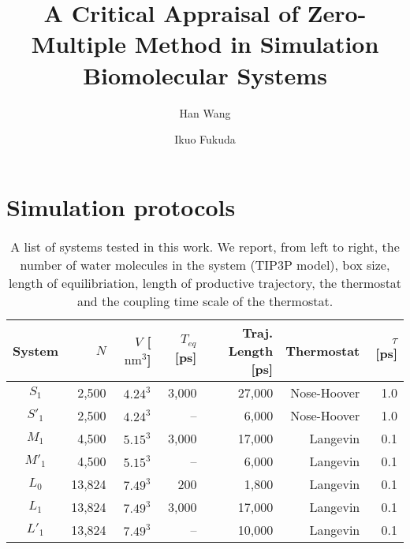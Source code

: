 \documentclass[aip,jcp,a4paper,preprint,unsortedaddress,onecolumn,fleqn]{revtex4-1}
\newcommand{\systemsb}{S_1}
\newcommand{\systemsbp}{S'_1}
\newcommand{\systemmb}{M_1}
\newcommand{\systemmbp}{M'_1}
\newcommand{\systemla}{L_0}
\newcommand{\systemlbp}{L'_1}
\newcommand{\systemlb}{L_1}
\begin{document}
\title{A Critical Appraisal of Zero-Multiple Method in Simulation Biomolecular Systems}
\author{Han Wang}
\author{Ikuo Fukuda}

\begin{abstract}
\end{abstract}

\maketitle

\section{Simulation protocols}

\begin{table}
  \centering
  \caption{A list of systems tested in this work. We report, from left to right, the number of water
    molecules in the system (TIP3P model), box size, length of equilibriation, length of productive trajectory, the thermostat and the coupling time scale of the thermostat.
    }
  \begin{tabular*}{0.9\textwidth}{@{\extracolsep{\fill}}c rrrrrr}\hline\hline
    System      & $N$ & $V$ [$\textrm{nm}^3$]  & $T_{eq}$ [ps] & Traj. Length [ps] & Thermostat & $\tau$ [ps]  \\\hline
    $\systemsb$          & 2,500          & $4.24^3$              & 3,000        & 27,000        & Nose-Hoover & 1.0 \\
    $\systemsbp$         &   2,500        & $4.24^3$              & --           &  6,000        & Nose-Hoover & 1.0\\
    $\systemmb$          & 4,500          & $5.15^3$              & 3,000        & 17,000        & Langevin & 0.1\\
    $\systemmbp$         &   4,500        & $5.15^3$              & --           &  6,000        & Langevin & 0.1\\
    $\systemla$          &   13,824       & $7.49^3$              & 200          & 1,800         & Langevin & 0.1\\
    $\systemlb$          &   13,824       & $7.49^3$              & 3,000        & 17,000        & Langevin & 0.1\\
    $\systemlbp$         &   13,824       & $7.49^3$              & --           & 10,000        & Langevin & 0.1\\
    \hline\hline
  \end{tabular*}
  \label{tab:tmp1}
\end{table}
\end{document}
